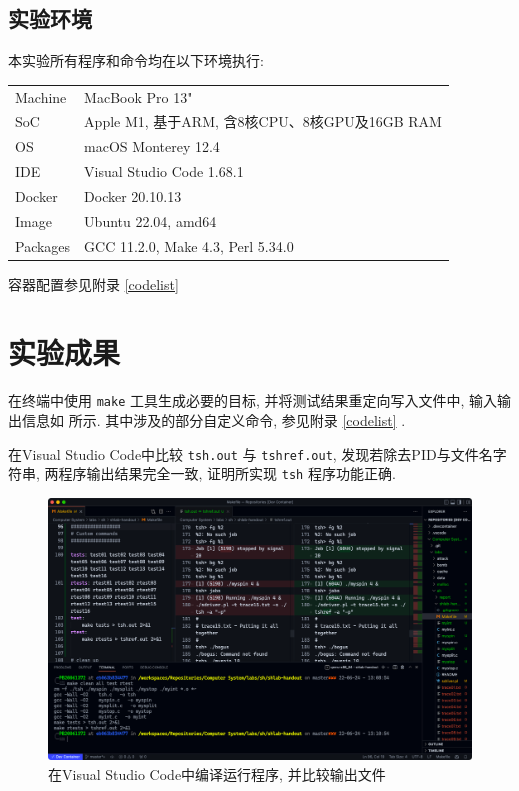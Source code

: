 \subsection{实验环境}

本实验所有程序和命令均在以下环境执行:
\begin{center}
    \small
    \begin{tabular}{ll}
        \toprule
            Machine & MacBook Pro 13" \\
            SoC & Apple M1, 基于ARM, 含8核CPU、8核GPU及16GB RAM \\
            OS & macOS Monterey 12.4 \\
            IDE & Visual Studio Code 1.68.1 \\
            Docker & Docker 20.10.13 \\
            Image & Ubuntu 22.04, amd64 \\
            Packages & GCC 11.2.0, Make 4.3, Perl 5.34.0 \\
        \bottomrule
    \end{tabular}
\end{center}

容器配置参见附录 \ref{codelist} 

\clearpage
\section{实验成果}

在终端中使用 \verb|make| 工具生成必要的目标, 并将测试结果重定向写入文件中, 输入输出信息如 所示. 其中涉及的部分自定义命令, 参见附录 \ref{codelist} .

在Visual Studio Code中比较 \verb|tsh.out| 与 \verb|tshref.out|, 发现若除去PID与文件名字符串, 两程序输出结果完全一致, 证明所实现 \verb|tsh| 程序功能正确.

\begin{figure}[H]
    \centering
    \includegraphics[width=\textwidth]{result.png}
    \caption{在Visual Studio Code中编译运行程序, 并比较输出文件}\label{result}
\end{figure}

